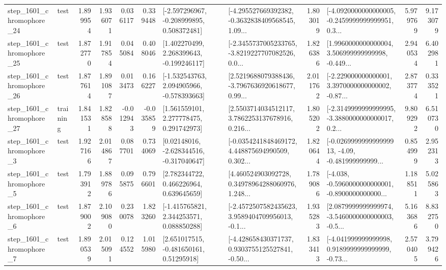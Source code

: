 \begin{tabular}{llrrrrllrlrr}
 step\_1601\_chromophore\_24 &      test &      1.899954 &    1.936071 &      0.036117 &  0.339448 &   [-2.597296967, -0.208999895, 0.508372481] &  [-4.295527669392382, -0.3632838409568545, 1.09... &       1.803019 &  [-4.0920000000000005, -0.2459999999999951, 0.3... &            5.979769 &          9.173079 \\
 step\_1601\_chromophore\_25 &      test &      1.872770 &    1.917854 &      0.045084 &  0.408046 &    [1.402270499, 2.268399643, -0.199246117] &  [-2.3455737005233765, -3.8219227707082526, 0.0... &       1.826386 &  [1.9960000000000004, 3.506999999999998, -0.449... &            2.940534 &          6.402981 \\
 step\_1601\_chromophore\_26 &      test &      1.877614 &    1.891087 &      0.013473 &  0.166227 &   [-1.532543763, 2.094905966, -0.578393663] &  [2.5219688079388436, -3.7967636920618677, 0.99... &       2.011762 &  [-2.229000000000001, 3.3970000000000002, -0.87... &            2.873774 &          0.333521 \\
 step\_1601\_chromophore\_27 &  training &      1.841531 &    1.828588 &     -0.012943 & -0.035859 &     [1.561559101, 2.277778475, 0.291742973] &  [2.5503714034512117, 3.7862253137678916, 0.216... &       1.805202 &  [-2.3149999999999995, -3.3880000000000017, 0.2... &            9.809292 &          6.510730 \\
  step\_1601\_chromophore\_3 &      test &      1.927166 &    2.014867 &      0.087701 &  0.734069 &    [0.02148016, -2.628344516, -0.317040647] &  [-0.0354241848469172, 4.448875694990509, 0.302... &       1.820644 &  [-0.026999999999999913, -4.09, -0.481999999999... &            0.854999 &          2.952313 \\
  step\_1601\_chromophore\_5 &      test &      1.793912 &    1.889786 &      0.095875 &  0.796601 &     [2.782344722, 0.466226964, 0.639645659] &  [4.460524903092728, 0.34978964288060976, 1.248... &       1.789086 &  [-4.038, -0.5960000000000001, -0.8900000000000... &            1.188511 &          5.025863 \\
  step\_1601\_chromophore\_6 &      test &      1.879002 &    2.109080 &      0.230078 &  1.823260 &    [-1.415765821, 2.344253571, 0.088850288] &  [-2.4572507582435623, 3.9589404709956013, -0.1... &       1.935283 &  [2.0879999999999974, -3.5460000000000003, -0.5... &            5.163686 &          8.832750 \\
  step\_1601\_chromophore\_7 &      test &      1.890539 &    2.015091 &      0.124552 &  1.015980 &     [2.651017515, -0.481650161, 0.51295918] &  [-4.428658430371737, 0.9303755125527841, -0.50... &       1.833413 &  [-4.041999999999998, 0.9189999999999999, -0.73... &            2.570405 &          3.799426 \\

\end{tabular}
